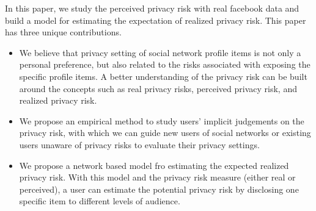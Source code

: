 \documentclass[a4paper]{article}
\begin{document}
In this paper, we study the perceived privacy risk with real facebook
data and build a model for estimating the expectation of realized
privacy risk. This paper has three unique contributions.
\begin{itemize}
\item We believe that privacy setting of social network profile items
  is not only a personal preference, but also related to the risks
  associated with exposing the specific profile items. A better
  understanding of the privacy risk can be built around the concepts
  such as real privacy risks, perceived privacy risk, and realized
  privacy risk.

\item We propose an empirical method to study users' implicit
  judgements on the privacy risk, with which we can guide new users of
  social networks or existing users unaware of privacy risks to
  evaluate their privacy settings.

\item We propose a network based model fro estimating the expected
  realized privacy risk. With this model and the privacy risk measure
  (either real or perceived), a user can estimate the potential
  privacy risk by disclosing one specific item to different levels of
  audience.
\end{itemize}




\end{document}

